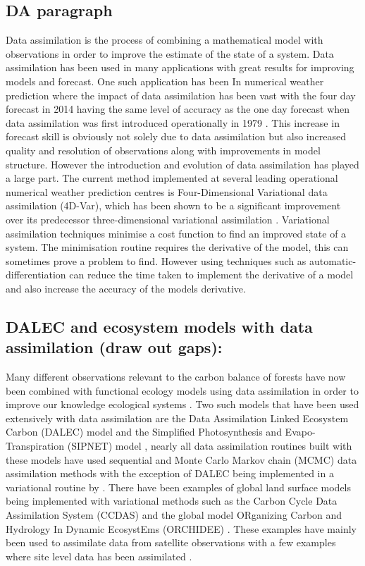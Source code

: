 \documentclass[11pt]{article}
\begin{document}
\subsection{DA paragraph}
Data assimilation is the process of combining a mathematical model with observations in order to improve the estimate of the state of a system. Data assimilation has been used in many applications with great results for improving models and forecast. One such application has been In numerical weather prediction where the impact of data assimilation has been vast with the four day forecast in 2014 having the same level of accuracy as the one day forecast when data assimilation was first introduced operationally in 1979 \citep{rabier2005overview, kalnay2003atmospheric}. This increase in forecast skill is obviously not solely due to data assimilation but also increased quality and resolution of observations along with improvements in model structure. However the introduction and evolution of data assimilation has played a large part. The current method implemented at several leading operational numerical weather prediction centres is Four-Dimensional Variational data assimilation (4D-Var), which has been shown to be a significant improvement over its predecessor three-dimensional variational assimilation \citep{lorenc2005does}. Variational assimilation techniques minimise a cost function to find an improved state of a system. The minimisation routine requires the derivative of the model, this can sometimes prove a problem to find. However using techniques such as automatic-differentiation can reduce the time taken to implement the derivative of a model and also increase the accuracy of the models derivative.

\subsection{DALEC and ecosystem models with data assimilation (draw out gaps):}
Many different observations relevant to the carbon balance of forests have now been combined with functional ecology models using data assimilation in order to improve our knowledge ecological systems \citep{zobitz2011primer, fox2009reflex}. Two such models that have been used extensively with data assimilation are the Data Assimilation Linked Ecosystem Carbon (DALEC) model \citep{williams2005improved} and the Simplified Photosynthesis and Evapo-Transpiration (SIPNET) model \citep{braswell2005estimating}, nearly all data assimilation routines built with these models have used sequential and Monte Carlo Markov chain (MCMC) data assimilation methods with the exception of DALEC being implemented in a variational routine by \citet{delahaies2013regularization}. There have been examples of global land surface models being implemented with variational methods such as the Carbon Cycle Data Assimilation System (CCDAS) \citep{Kaminski2013} and the global model ORganizing Carbon and Hydrology In Dynamic EcosystEms (ORCHIDEE) \citep{Krinner2005}. These examples have mainly been used to assimilate data from satellite observations with a few examples where site level data has been assimilated \citep{Verbeeck2011, Bacour2015}.
\end{document}
